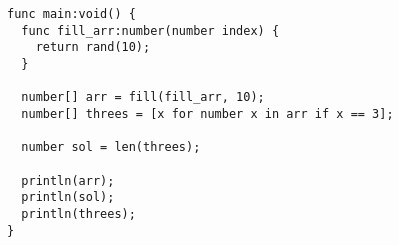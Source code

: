 \begin{verbatim}
func main:void() {
  func fill_arr:number(number index) {
    return rand(10);
  }

  number[] arr = fill(fill_arr, 10);
  number[] threes = [x for number x in arr if x == 3];

  number sol = len(threes);

  println(arr);
  println(sol);
  println(threes);
}
\end{verbatim}